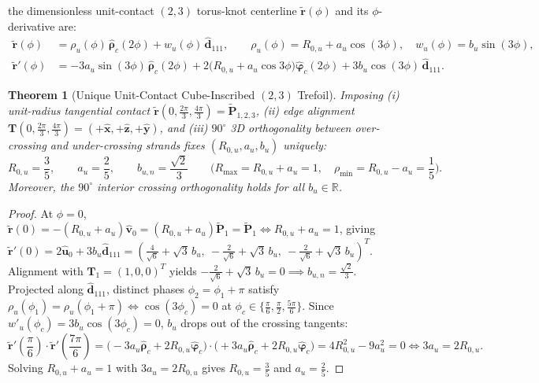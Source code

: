 \documentclass[11pt, a4paper]{article}
\newtheorem{theorem}{Theorem}[section]
\DeclareRobustCommand{\Rmax}{R_{\max}}
\begin{document}
the dimensionless unit-contact $(2,3)$ torus-knot centerline $\tilde{\mathbf{r}}(\phi)$ and its $\phi$-derivative are:
\begin{align}
    \tilde{\mathbf{r}}(\phi) &= \rho_u(\phi)\,\hat{\boldsymbol{\rho}}_c(2\phi) + w_u(\phi)\,\hat{\mathbf{d}}_{111}, \qquad \rho_u(\phi) = R_{0,u} + a_u\cos(3\phi), \quad w_u(\phi) = b_u\sin(3\phi), \label{eq:master_trefoil}\\
    \tilde{\mathbf{r}}'(\phi) &= -3a_u\sin(3\phi)\,\hat{\boldsymbol{\rho}}_c(2\phi) + 2\big(R_{0,u} + a_u\cos 3\phi\big)\hat{\boldsymbol{\varphi}}_c(2\phi) + 3b_u\cos(3\phi)\,\hat{\mathbf{d}}_{111}. \label{eq:first_deriv}
\end{align}

\begin{theorem}[Unique Unit-Contact Cube-Inscribed $(2,3)$ Trefoil]
\label{thm:cube_inscribed}
Imposing (i) unit-radius tangential contact $\tilde{\mathbf{r}}(0, \frac{2\pi}{3}, \frac{4\pi}{3}) = \tilde{\mathbf{P}}_{1,2,3}$, (ii) edge alignment $\mathbf{T}(0, \frac{2\pi}{3}, \frac{4\pi}{3}) = (+\hat{\mathbf{x}}, +\hat{\mathbf{z}}, +\hat{\mathbf{y}})$, and (iii) $90^\circ$ 3D orthogonality between over-crossing and under-crossing strands fixes $(R_{0,u}, a_u, b_u)$ uniquely:
\begin{equation}
    R_{0,u} = \frac{3}{5}, \qquad a_u = \frac{2}{5}, \qquad b_{u,n} = \frac{\sqrt{2}}{3}
    \qquad \Big(\Rmax = R_{0,u} + a_u = 1, \quad \rho_{\min} = R_{0,u} - a_u = \frac{1}{5}\Big).
    \label{eq:exact_cube_constants}
\end{equation}
Moreover, the $90^\circ$ interior crossing orthogonality holds for all $b_u \in \mathbb{R}$.
\end{theorem}

\begin{proof}
At $\phi = 0$, $\tilde{\mathbf{r}}(0) = -(R_{0,u} + a_u)\hat{\mathbf{v}}_0 = (R_{0,u}+a_u)\tilde{\mathbf{P}}_1 = \tilde{\mathbf{P}}_1 \iff R_{0,u} + a_u = 1$, giving $\tilde{\mathbf{r}}'(0) = 2\hat{\mathbf{u}}_0 + 3b_u\hat{\mathbf{d}}_{111} = (\frac{4}{\sqrt{6}} + \sqrt{3}\,b_u,\ -\frac{2}{\sqrt{6}} + \sqrt{3}\,b_u,\ -\frac{2}{\sqrt{6}} + \sqrt{3}\,b_u)^T$. Alignment with $\mathbf{T}_1 = (1,0,0)^T$ yields $-\frac{2}{\sqrt{6}} + \sqrt{3}\,b_u = 0 \implies b_{u,n} = \frac{\sqrt{2}}{3}$. Projected along $\hat{\mathbf{d}}_{111}$, distinct phases $\phi_2 = \phi_1 + \pi$ satisfy $\rho_u(\phi_1) = \rho_u(\phi_1 + \pi) \iff \cos(3\phi_c) = 0$ at $\phi_c \in \{\frac{\pi}{6}, \frac{\pi}{2}, \frac{5\pi}{6}\}$. Since $w'_u(\phi_c) = 3b_u\cos(3\phi_c) = 0$, $b_u$ drops out of the crossing tangents:
\begin{equation}
    \tilde{\mathbf{r}}'\!\left(\frac{\pi}{6}\right)\cdot\tilde{\mathbf{r}}'\!\left(\frac{7\pi}{6}\right) = \big(-3a_u\hat{\boldsymbol{\rho}}_c + 2R_{0,u}\hat{\boldsymbol{\varphi}}_c\big)\cdot\big(+3a_u\hat{\boldsymbol{\rho}}_c + 2R_{0,u}\hat{\boldsymbol{\varphi}}_c\big) = 4R_{0,u}^2 - 9a_u^2 = 0 \iff 3a_u = 2R_{0,u}.
    \label{eq:90deg_crossing_lock}
\end{equation}
Solving $R_{0,u} + a_u = 1$ with $3a_u = 2R_{0,u}$ gives $R_{0,u} = \frac{3}{5}$ and $a_u = \frac{2}{5}$.
\end{proof}
\end{document}
